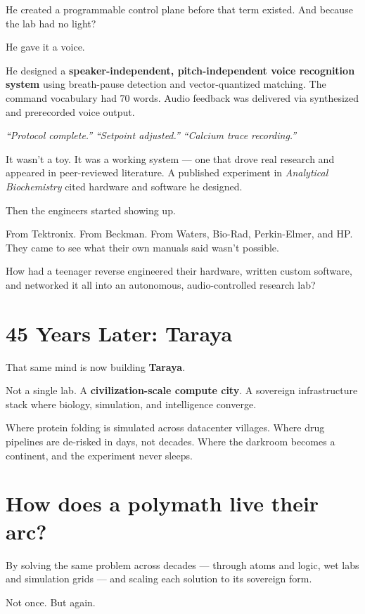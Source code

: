 \documentclass[12pt]{article}
\begin{document}
\begin{spacing}{1.25}
        He created a programmable control plane before that term existed. And because the lab had no light?

        He gave it a voice.

        He designed a \textbf{speaker-independent, pitch-independent voice recognition system} using breath-pause detection and vector-quantized matching. The command vocabulary had 70 words. Audio feedback was delivered via synthesized and prerecorded voice output.

        \textit{“Protocol complete.”}
        \textit{“Setpoint adjusted.”}
        \textit{“Calcium trace recording.”}

        It wasn’t a toy. It was a working system — one that drove real research and appeared in peer-reviewed literature. A published experiment in \textit{Analytical Biochemistry} cited hardware and software he designed.

        Then the engineers started showing up.

        From Tektronix. From Beckman. From Waters, Bio-Rad, Perkin-Elmer, and HP. They came to see what their own manuals said wasn’t possible.

        How had a teenager reverse engineered their hardware, written custom software, and networked it all into an autonomous, audio-controlled research lab?

        \section*{45 Years Later: Taraya}

        That same mind is now building \textbf{Taraya}.

        Not a single lab. A \textbf{civilization-scale compute city}. A sovereign infrastructure stack where biology, simulation, and intelligence converge.

        Where protein folding is simulated across datacenter villages.
        Where drug pipelines are de-risked in days, not decades.
        Where the darkroom becomes a continent, and the experiment never sleeps.

        \section*{How does a polymath live their arc?}

        By solving the same problem across decades —
        through atoms and logic, wet labs and simulation grids —
        and scaling each solution to its sovereign form.

        Not once. But again.

    \end{spacing}
\end{document}
